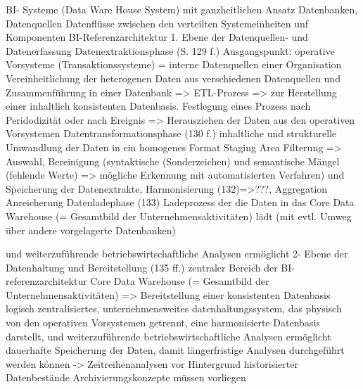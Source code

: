 
BI- Systeme (Data Ware House System) mit ganzheitlichen Ansatz
    Datenbanken, Datenquellen
    Datenflüsse zwischen den verteilten Systemeinheiten unf Komponenten
BI-Referenzarchitektur
1. Ebene der Datenquellen- und Datenerfassung
    Datenextraktionsphase (S. 129 f.)
        Ausgangspunkt: operative Vorsysteme (Transaktionssysteme) = interne Datenquellen einer Organisation
        Vereinheitlichung der heterogenen Daten aus verschiedenen Datenquellen und Zusammenführung in einer Datenbank => ETL-Prozess
        => zur Herstellung einer inhaltlich konsistenten Datenbasis.
        Festlegung eines Prozess nach Peridodizität oder nach Ereignis => Herausziehen der Daten aus den operativen Vorsystemen       
    Datentransformationsphase (130 f.)
        inhaltliche und strukturelle Umwandlung der Daten in ein homogenes Format
        Staging  Area
            Filterung => Auswahl, Bereinigung (syntaktische (Sonderzeichen) und semantische Mängel (fehlende Werte) => mögliche Erkennung mit automatisierten Verfahren) und Speicherung der Datenextrakte, 
        Harmonisierung (132)=>???, 
        Aggregation
        Anreicherung
    Datenladephase (133)
        Ladeprozess der die Daten in das Core Data Warehouse (= Gesamtbild der Unternehmensaktivitäten) lädt (mit evtl. Umweg über andere vorgelagerte Datenbanken)
        
  und weiterzuführende betriebswirtschaftliche Analysen ermöglicht
2- Ebene der Datenhaltung und Bereitstellung (135 ff.)
    zentraler Bereich der BI-referenzarchitektur
    Core Data Warehouse (= Gesamtbild der Unternehmensaktivitäten) => Bereitstellung einer konsistenten Datenbasis
    logisch zentralisiertes, unternehmensweites datenhaltungssystem, das physisch von den operativen Vorsystemen getrennt, eine harmonisierte Datenbasis darstellt,
    und weiterzuführende betriebswirtschaftliche Analysen ermöglicht
    dauerhafte Speicherung der Daten, damit längerfristige Analysen durchgeführt werden können -> Zeitreihenanalysen vor Hintergrund historisierter Datenbestände
    Archivierungskonzepte müssen vorliegen
